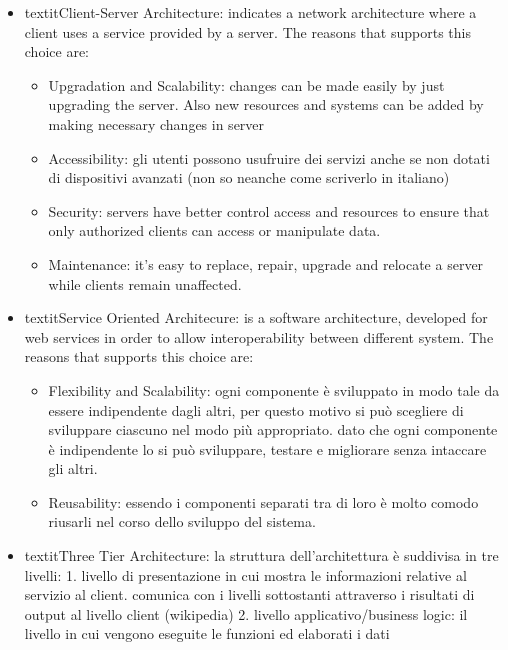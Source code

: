 \documentclass[english]{article}
\begin{document}
\begin{itemize}
  \item{textit{Client-Server Architecture}: indicates a network architecture where a client uses a service provided by a server. The reasons that supports this choice are:
    \begin{itemize}
      \item{Upgradation and Scalability: changes can be made easily by just upgrading the server. Also new resources and systems can be added by making necessary changes in server}
      \item{Accessibility: gli utenti possono usufruire dei servizi anche se non dotati di dispositivi avanzati (non so neanche come scriverlo in italiano)}
      \item{Security: servers have better control access and resources to ensure that only authorized clients can access or manipulate data.}
      \item{Maintenance: it’s easy to replace, repair, upgrade and relocate a server while clients remain unaffected.}
    \end{itemize}
  }
  \item{textit{Service Oriented Architecure}: is a software architecture, developed for web services in order to allow interoperability between different system. The reasons that supports this choice are:
    \begin{itemize}
      \item{Flexibility and Scalability: ogni componente è sviluppato in modo tale da essere indipendente dagli altri, per questo motivo si può scegliere di sviluppare ciascuno nel modo più appropriato.
                                          dato che ogni componente è indipendente lo si può sviluppare, testare e migliorare senza intaccare gli altri.}
      \item{Reusability: essendo i componenti separati tra di loro è molto comodo riusarli nel corso dello sviluppo del sistema.}
      \end{itemize}
  }
  \item{textit{Three Tier Architecture}: la struttura dell'architettura è suddivisa in tre livelli:
                                        1. livello di presentazione in cui mostra le informazioni relative al servizio al client.
                                          comunica con i livelli sottostanti attraverso i risultati di output al livello client (wikipedia)
                                        2. livello applicativo/business logic: il livello in cui vengono eseguite le funzioni ed elaborati i dati
}
\end{itemize}
\end{document}
